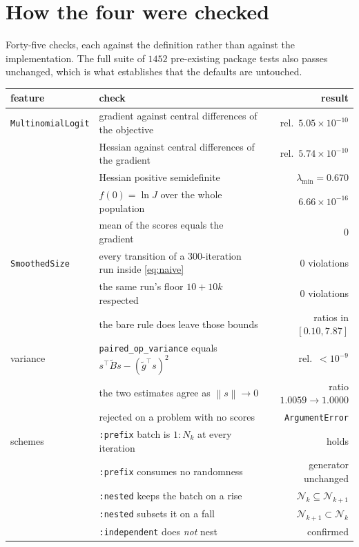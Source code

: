\documentclass[11pt,a4paper]{article}
\providecommand{\norm}[1]{\left \lVert #1 \right \rVert}
\begin{document}
\section{How the four were checked}

Forty-five checks, each against the definition rather than against the
implementation. The full suite of $1452$ pre-existing package tests also passes
unchanged, which is what establishes that the defaults are untouched.

\begin{center}
\small
\setlength{\tabcolsep}{4pt}
\begin{tabular}{lp{8.6cm}r}
\toprule
feature & check & result \\
\midrule
\texttt{MultinomialLogit}
  & gradient against central differences of the objective & rel.\ $5.05\times10^{-10}$ \\
  & Hessian against central differences of the gradient   & rel.\ $5.74\times10^{-10}$ \\
  & Hessian positive semidefinite                          & $\lambda_{\min} = 0.670$ \\
  & $f(0) = \ln J$ over the whole population               & $6.66\times10^{-16}$ \\
  & mean of the scores equals the gradient                 & $0$ \\
\midrule
\texttt{SmoothedSize}
  & every transition of a 300-iteration run inside \eqref{eq:naive} & $0$ violations \\
  & the same run's floor $10 + 10k$ respected               & $0$ violations \\
  & the bare rule does leave those bounds                   & ratios in $[0.10, 7.87]$ \\
\midrule
variance
  & \texttt{paired\_op\_variance} equals $s^\top\tilde Bs - (\tilde g^\top s)^2$ & rel.\ $<10^{-9}$ \\
  & the two estimates agree as $\norm{s}\to0$               & ratio $1.0059 \to 1.0000$ \\
  & rejected on a problem with no scores                    & \texttt{ArgumentError} \\
\midrule
schemes
  & \texttt{:prefix} batch is $1{:}N_k$ at every iteration  & holds \\
  & \texttt{:prefix} consumes no randomness                 & generator unchanged \\
  & \texttt{:nested} keeps the batch on a rise              & $\mathcal{N}_k \subseteq \mathcal{N}_{k+1}$ \\
  & \texttt{:nested} subsets it on a fall                   & $\mathcal{N}_{k+1} \subset \mathcal{N}_k$ \\
  & \texttt{:independent} does \emph{not} nest              & confirmed \\
\bottomrule
\end{tabular}
\end{center}
\end{document}

